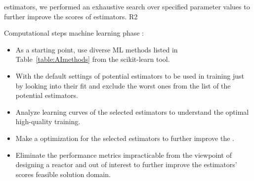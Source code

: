     \DIFaddend estimators, we performed an    exhaustive search over specified parameter values \DIFdelbegin {}\DIFdelend to further improve the scores of estimators. \DIFaddbegin {}\gls{R2} \DIFaddend 

    Computational steps \DIFdelbegin {}\DIFdelend \DIFaddbegin {}\DIFaddend machine learning phase \DIFaddbegin {}\DIFaddend :
    \begin{itemize}
    	\item As a starting point, use diverse \gls{ML} methods \DIFdelbegin \DIFdel{, }\DIFdelend listed in Table~\ref{table:AImethods} \DIFdelbegin \DIFdel{, }\DIFdelend from the scikit-learn tool.
    	\item With the default settings of \DIFdelbegin {}\DIFdelend \DIFaddbegin {}\DIFaddend potential estimators to be used in training just by looking into their fit \DIFdelbegin {}\DIFdelend \DIFaddbegin {}\DIFaddend and exclude the worst ones from the list of the potential estimators.
    	\item Analyze \DIFdelbegin {}\DIFdelend learning curves of the selected estimators to understand the optimal \DIFdelbegin {}\DIFdelend \DIFaddbegin {}\DIFaddend high-quality training.
    	\item Make a \DIFdelbegin {}\DIFdelend \DIFaddbegin {}\DIFaddend optimization for the selected estimators to further improve the \DIFdelbegin {}\DIFdelend \DIFaddbegin {}\DIFaddend .
    	\item Eliminate \DIFdelbegin {}\DIFdelend \DIFaddbegin {}\DIFaddend the performance metrics \DIFdelbegin {}\DIFdelend \DIFaddbegin {}\DIFaddend impracticable from the viewpoint of designing a reactor and \DIFdelbegin {}\DIFdelend out of interest \DIFdelbegin \DIFdel{,
	}\DIFdelend \DIFaddbegin {}\DIFaddend to further improve the estimators' scores \DIFdelbegin {}\DIFdelend \DIFaddbegin {}\DIFaddend feasible solution domain.

\end{itemize}
